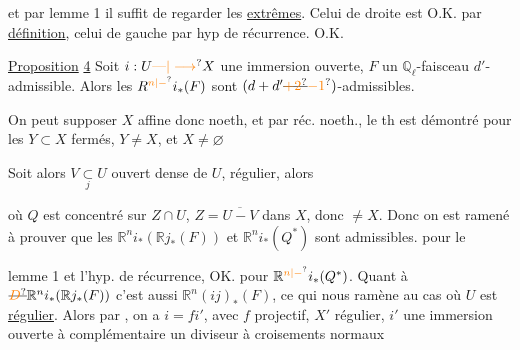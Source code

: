 et  par lemme 1 il suffit de regarder les \uline{extrêmes}. Celui de droite est O.K.  par \uline{définition}, celui de gauche par hyp de récurrence. \quad O.K.

\uline{Proposition} \uline{4} \quad Soit $i:U\unsure{\text{---}|\longrightarrow}X$ une immersion ouverte,  $F$ un  $\mathbb Q_\ell$-faisceau $d'$-admissible. Alors les $R^{\unsure{n|-}}i_*(F)$ sont $(d+d'\deleted{\unsure{+2}}\unsure{-1})$-admissibles.

 

On peut supposer $X$ affine donc noeth, et par réc. noeth.,  le th est démontré pour les $Y\subset X$ fermés, $Y\neq X$, et $X\neq\varnothing$

Soit alors $V\underset{j}{\subset}U$ ouvert dense de $U$, régulier, alors


où $Q$ est concentré sur $Z\cap U$, $Z=\overline{U-V}$ \uline{} dans $X$, donc $\neq X$. Donc on est ramené à prouver que les $\mathbb R^n i_*(\mathbb R j_*(F))$ et $\mathbb R^n i_*(Q^*)$ sont admissibles. pour le


lemme 1 et l'hyp. de récurrence, OK. pour $\mathbb R^{\unsure{n|-}}i_*(Q^*)$. Quant à $\deleted{\unsure{D}}\mathbb R^ni_*(\mathbb R j_*(F))$ c'est aussi $\mathbb R^n(ij)_*(F)$, ce qui nous ramène au cas où $U$ est \uline{régulier}. Alors par , on a $i=fi'$, avec $f$ projectif, $X'$ régulier, $i'$ une immersion ouverte à complémentaire un diviseur à croisements normaux


